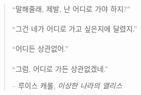 
\newpage \vspace*{4cm}
\thispagestyle{empty}
\begin{quotation}
\begin{center}
  \large
  \enquote{말해줄래, 제발, 난 어디로 가야 하지?} \\~\\
  \enquote{그건 네가 어디로 가고 싶은지에 달렸지.} \\~\\
  \enquote{어디든 상관없어.} \\~\\
  \enquote{그럼, 어디로 가든 상관없겠네.}
\end{center}
\begin{flushright} -- 루이스 캐롤, \textit{이상한 나라의 앨리스}\end{flushright}
\end{quotation}